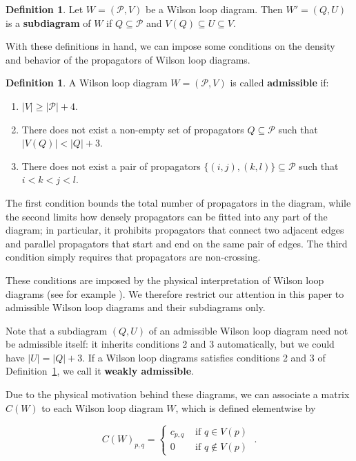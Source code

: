 \documentclass[11pt]{article}
\newcommand{\cP}{\mathcal{P}}
\theoremstyle{remark}
\theoremstyle{definition}
\newtheorem{dfn}[thm]{Definition}
\begin{document}
\begin{dfn} \label{subdiagramdfn}
Let $W = (\cP, V)$ be a Wilson loop diagram. Then $W' = (Q,U)$ is a {\bf subdiagram} of $W$ if $Q \subseteq \cP$ and $V(Q) \subseteq U \subseteq V$.
\end{dfn}



With these definitions in hand, we can impose some conditions on the density and behavior of the propagators of Wilson loop diagrams.

\begin{dfn}\label{admisdfn}
A Wilson loop diagram $W = (\cP, V)$ is called {\bf admissible} if:
\begin{enumerate}
\item $|V| \geq |\cP| + 4$.
\item There does not exist a non-empty set of propagators $Q \subseteq \cP$ such that $|V(Q)| < |Q| + 3$.
\item There does not exist a pair of propagators $\{(i,j),(k,l)\} \subseteq \cP$ such that $i < k < j < l$.
\end{enumerate}
 \end{dfn}

The first condition bounds the total number of propagators in the diagram, while the second limits how densely propagators can be fitted into any part of the diagram; in particular, it prohibits propagators that connect two adjacent edges and parallel propagators that start and end on the same pair of edges. The third condition simply requires that propagators are non-crossing. 

These conditions are imposed by the physical interpretation of Wilson loop diagrams (see for example \cite{Adamo:2011pv,Adamo:2012xe,wilsonloop,LipsteinMason}). We therefore restrict our attention in this paper to admissible Wilson loop diagrams and their subdiagrams only. 


Note that a subdiagram $(Q,U)$ of an admissible Wilson loop diagram need not be admissible itself: it inherits conditions 2 and 3 automatically, but we could have $|U| = |Q| + 3$. If a Wilson loop diagrams satisfies conditions 2 and 3 of Definition~\ref{admisdfn}, we call it {\bf weakly admissible}.



Due to the physical motivation behind these diagrams, we can associate a matrix $C(W)$ to each Wilson loop diagram $W$, which is defined elementwise by

\begin{equation} C(W)_{p,q} = \begin{cases} c_{p,q} & \textrm{ if } q \in V(p) \\
0  & \textrm{ if } q \not \in V(p)  \end{cases}
\;. \label{C(W) dfn}\end{equation}
\end{document}
